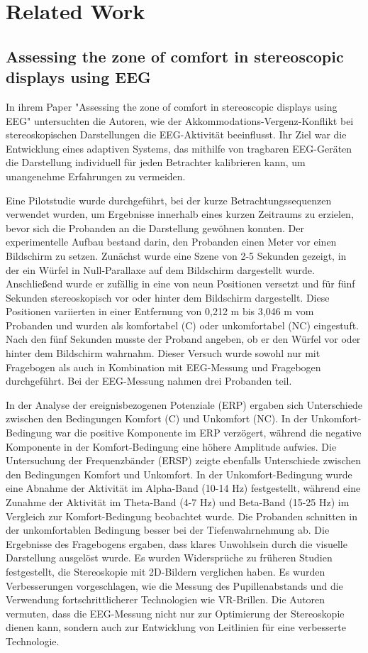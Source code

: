 \documentclass[conference]{IEEEtran}
\begin{document}
\section{Related Work}
\subsection{Assessing the zone of comfort in stereoscopic displays using EEG}
In ihrem Paper "\textnormal{Assessing} the zone of comfort in stereoscopic displays using EEG" \cite{b1} untersuchten die Autoren, wie der Akkommodations-Vergenz-Konflikt bei stereoskopischen Darstellungen die EEG-Aktivität beeinflusst. Ihr Ziel war die Entwicklung eines adaptiven Systems, das mithilfe von tragbaren EEG-Geräten die Darstellung individuell für jeden Betrachter kalibrieren kann, um unangenehme Erfahrungen zu vermeiden.

Eine Pilotstudie wurde durchgeführt, bei der kurze Betrachtungssequenzen verwendet wurden, um Ergebnisse innerhalb eines kurzen Zeitraums zu erzielen, bevor sich die Probanden an die Darstellung gewöhnen konnten. Der experimentelle Aufbau bestand darin, den Probanden einen Meter vor einen Bildschirm zu setzen. Zunächst wurde eine Szene von 2-5 Sekunden gezeigt, in der ein Würfel in Null-Parallaxe auf dem Bildschirm dargestellt wurde. Anschließend wurde er zufällig in eine von neun Positionen versetzt und für fünf Sekunden stereoskopisch vor oder hinter dem Bildschirm dargestellt. Diese Positionen variierten in einer Entfernung von 0,212 m bis 3,046 m vom Probanden und wurden als komfortabel (C) oder unkomfortabel (NC) eingestuft. Nach den fünf Sekunden musste der Proband angeben, ob er den Würfel vor oder hinter dem Bildschirm wahrnahm. Dieser Versuch wurde sowohl nur mit Fragebogen als auch in Kombination mit EEG-Messung und Fragebogen durchgeführt. Bei der EEG-Messung nahmen drei Probanden teil.
 
In der Analyse der ereignisbezogenen Potenziale (ERP) ergaben sich Unterschiede zwischen den Bedingungen Komfort (C) und Unkomfort (NC). In der Unkomfort-Bedingung war die positive Komponente im ERP verzögert, während die negative Komponente in der Komfort-Bedingung eine höhere Amplitude aufwies. Die Untersuchung der Frequenzbänder (ERSP) zeigte ebenfalls Unterschiede zwischen den Bedingungen Komfort und Unkomfort. In der Unkomfort-Bedingung wurde eine Abnahme der Aktivität im Alpha-Band (10-14 Hz) festgestellt, während eine Zunahme der Aktivität im Theta-Band (4-7 Hz) und Beta-Band (15-25 Hz) im Vergleich zur Komfort-Bedingung beobachtet wurde. Die Probanden schnitten in der unkomfortablen Bedingung besser bei der Tiefenwahrnehmung ab. Die Ergebnisse des Fragebogens ergaben, dass klares Unwohlsein durch die visuelle Darstellung ausgelöst wurde. Es wurden Widersprüche zu früheren Studien festgestellt, die Stereoskopie mit 2D-Bildern verglichen haben. Es wurden Verbesserungen vorgeschlagen, wie die Messung des Pupillenabstands und die Verwendung fortschrittlicherer Technologien wie VR-Brillen. Die Autoren vermuten, dass die EEG-Messung nicht nur zur Optimierung der Stereoskopie dienen kann, sondern auch zur Entwicklung von Leitlinien für eine verbesserte Technologie.
\end{document}
